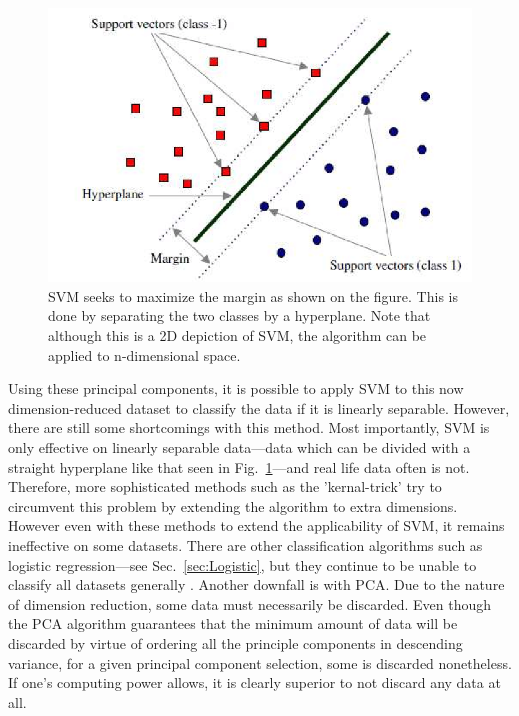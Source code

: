 \documentclass[a4paper,fleqn,usenatbib]{mnras}
\begin{document}
\begin{figure}
\includegraphics[width=\columnwidth]{../Figures/SVMpic}
\caption{SVM seeks to maximize the margin as shown on the figure. This is done by separating the two classes by a hyperplane. Note that although this is a 2D depiction of SVM, the algorithm can be applied to n-dimensional space. \label{figure:SVMex} \protect\citep{SVMPic}}
\end{figure}


Using these principal components, it is possible to apply SVM to this now dimension-reduced dataset to classify the data if it is linearly separable.  However, there are still some shortcomings with this method. Most importantly, SVM is only effective on linearly separable data---data which can be divided with a straight hyperplane like that seen in Fig.~\ref{figure:SVMex}---and real life data often is not. Therefore, more sophisticated methods such as the 'kernal-trick' \citep{kernaltrick} try to circumvent this problem by extending the algorithm to extra dimensions. However even with these methods to extend the applicability of SVM, it remains ineffective on some datasets. There are other classification algorithms such as logistic regression---see Sec.~\ref{sec:Logistic}, but they continue to be unable to classify all datasets generally \citep{UniversalApproximationTheorem}. Another downfall is with PCA. Due to the nature of dimension reduction, some data must necessarily be discarded. Even though the PCA algorithm guarantees that the minimum amount of data will be discarded by virtue of ordering all the principle components in descending variance, for a given principal component selection, some is discarded nonetheless. If one's computing power allows, it is clearly superior to not discard any data at all. 
\end{document}
